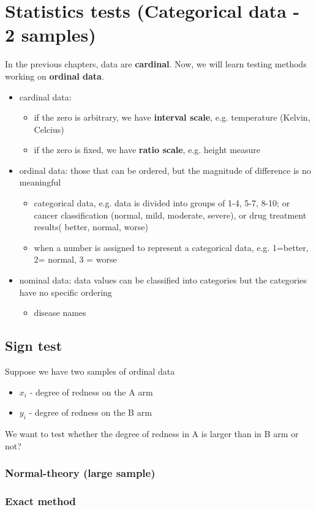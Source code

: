 
\chapter{Statistics tests (Categorical data - 2 samples)}
\label{chap:stat-tests-categ}

In the previous chapters, data are {\bf cardinal}. Now, we will learn
testing methods working on {\bf ordinal data}.

\begin{itemize}
\item cardinal data:
  \begin{itemize}
  \item if the zero is arbitrary, we have {\bf interval scale},
    e.g. temperature (Kelvin, Celcius)
  \item if the zero is fixed, we have {\bf ratio scale}, e.g. height measure
  \end{itemize}

\item ordinal data: those that can be ordered, but the magnitude of
  difference is no meaningful
  \begin{itemize}
  \item categorical data, e.g. data is divided into groups of 1-4,
    5-7, 8-10; or cancer classification (normal, mild, moderate,
    severe), or drug treatment results( better, normal, worse) 
  \item when a number is assigned to represent a categorical data,
    e.g. 1=better, 2= normal, 3 = worse
  \end{itemize}

\item nominal data: data values can be classified into categories but
  the categories have no specific ordering
  \begin{itemize}
  \item disease names
  \end{itemize}
\end{itemize}

\section{Sign test}
\label{sec:sign-test}

Suppose we have two samples of ordinal data
\begin{itemize}
\item $x_i$ - degree of redness on the A arm
\item $y_i$ - degree of redness on the B arm
\end{itemize}
We want to test whether the degree of redness in A is larger than in B
arm or not?

\subsection{Normal-theory (large sample)}
\label{sec:normal-theory-large}


\subsection{Exact method}
\label{sec:exact-method}




